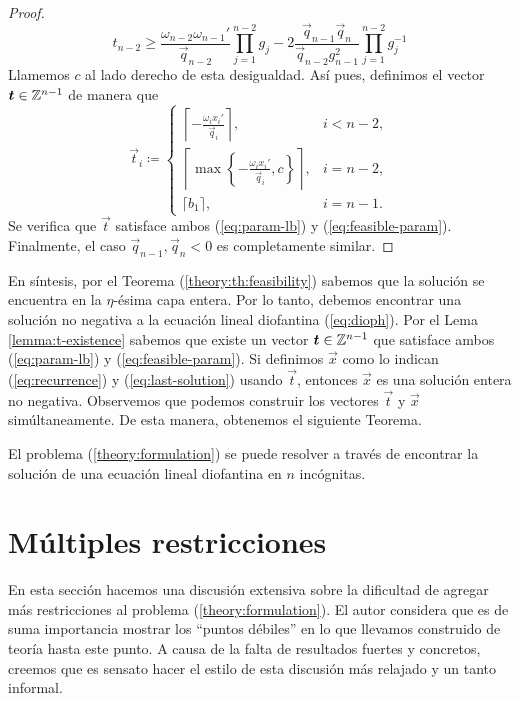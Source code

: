 \begin{proof}
	\begin{equation*}
		t_{n-2} \geq \frac{\omega_{n-2}\omega_{n-1}'}{\vec{q}_{n-2}}\prod_{j=1}^{n-2}g_j
		- 2\frac{\vec{q}_{n-1}\vec{q}_n}{\vec{q}_{n-2}g_{n-1}^2}
		\prod_{j=1}^{n-2}g_j^{-1}
	\end{equation*}
	Llamemos $c$ al lado derecho de esta desigualdad. Así pues, definimos el vector
	$\boldsymbol{t} \in \mathbb{Z}^{n-1}$ de manera que
	\begin{equation*}
		\vec{t}_i \coloneq \begin{cases}
			\left\lceil -\frac{\omega_i x_i'}{\vec{q}_i} \right\rceil, & i < n - 2, \\[1em]
			\left\lceil \max\left\lbrace -\frac{\omega_ix_i'}{\vec{q}_i}, c \right\rbrace
			\right\rceil, & i = n -2, \\[0.8em]
			\lceil b_1 \rceil, & i = n - 1.
		\end{cases}
	\end{equation*}
	Se verifica que $\vec{t}$ satisface ambos (\ref{eq:param-lb}) y (\ref{eq:feasible-param}).
	Finalmente, el caso $\vec{q}_{n-1}, \vec{q}_n < 0$ es completamente similar.
\end{proof}

En síntesis, por el Teorema (\ref{theory:th:feasibility}) sabemos que la solución se encuentra en
la $\eta$-ésima capa entera. Por lo tanto, debemos encontrar una solución no negativa a la ecuación
lineal diofantina (\ref{eq:dioph}). Por el Lema \ref{lemma:t-existence} sabemos que existe un vector
$\boldsymbol{t} \in \mathbb{Z}^{n-1}$ que satisface ambos (\ref{eq:param-lb}) y (\ref{eq:feasible-param}). Si
definimos $\vec{x}$ como lo indican (\ref{eq:recurrence}) y (\ref{eq:last-solution}) usando
$\vec{t}$, entonces $\vec{x}$ es una solución entera no negativa. Observemos que podemos construir
los vectores $\vec{t}$ y $\vec{x}$ simúltaneamente. De esta manera, obtenemos el siguiente Teorema.

\begin{theorem}
	\label{infinite:th:complexity}
	El problema (\ref{theory:formulation}) se puede resolver a través de encontrar la solución de
	una ecuación lineal diofantina en $n$ incógnitas.
\end{theorem}

\section{Múltiples restricciones}
\noindent
En esta sección hacemos una discusión extensiva sobre la dificultad de agregar más restricciones al
problema (\ref{theory:formulation}). El autor considera que es de suma importancia mostrar los
``puntos débiles'' en lo que llevamos construido de teoría hasta este punto. A causa de la falta de
resultados fuertes y concretos, creemos que es sensato hacer el estilo de esta discusión más
relajado y un tanto informal.

